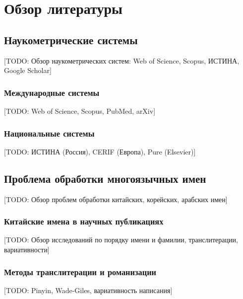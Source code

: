
\chapter{Обзор литературы}
\label{ch:literature}

\section{Наукометрические системы}
\label{sec:lit:scientometric}

[TODO: Обзор наукометрических систем: Web of Science, Scopus, ИСТИНА, Google Scholar]

\subsection{Международные системы}
\label{subsec:lit:international}

[TODO: Web of Science, Scopus, PubMed, arXiv]

\subsection{Национальные системы}
\label{subsec:lit:national}

[TODO: ИСТИНА (Россия), CERIF (Европа), Pure (Elsevier)]

\section{Проблема обработки многоязычных имен}
\label{sec:lit:multilingual}

[TODO: Обзор проблем обработки китайских, корейских, арабских имен]

\subsection{Китайские имена в научных публикациях}
\label{subsec:lit:chinese_names}

[TODO: Обзор исследований по порядку имени и фамилии, транслитерации, вариативности]

\subsection{Методы транслитерации и романизации}
\label{subsec:lit:transliteration}

[TODO: Pinyin, Wade-Giles, вариативность написания]

